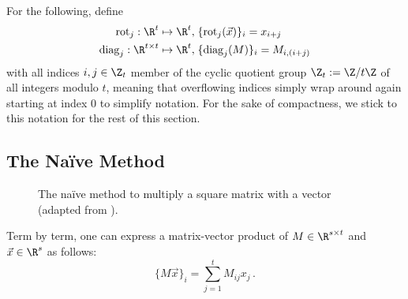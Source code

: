 For the following, define
\newcommand{\rot}{\mathrm{rot}}
\newcommand{\diag}{\mathrm{diag}}
\begin{align}
  \rot_j: \R^t \mapsto \R^t,             & \; \{\rot_j(\vec{x})\}_i = x_{i + j} \label{eq:rot-definition} \\
  \diag_j: \R^{t \times t} \mapsto \R^t, & \; \{\diag_j(M)\}_i = M_{i, (i+j)} \label{eq:diag-definition}
\end{align}
with all indices $i, j \in \Z_t$ member of the cyclic quotient group $\Z_t := \Z / t \Z$ of all integers modulo $t$, meaning that overflowing indices simply wrap around again starting at index $0$ to simplify notation.
For the sake of compactness, we stick to this notation for the rest of this section.

\pagebreak
\subsection{The Naïve Method}
\begin{figure}[H]
  \centering
  \caption{The naïve method to multiply a square matrix with a vector (adapted from \cite{2018-gazelle}).}
\end{figure}

Term by term, one can express a matrix-vector product of $M \in \R^{s \times t}$ and
$\vec{x} \in \R^s$ as follows:
$$\{M \vec{x}\}_i = \sum_{j=1}^{t} M_{ij} x_j \,.$$

